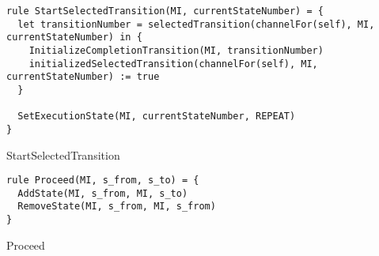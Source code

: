 \begin{listing}[H]
\begin{verbatim}
rule StartSelectedTransition(MI, currentStateNumber) = {
  let transitionNumber = selectedTransition(channelFor(self), MI, currentStateNumber) in {
    InitializeCompletionTransition(MI, transitionNumber)
    initializedSelectedTransition(channelFor(self), MI, currentStateNumber) := true
  }

  SetExecutionState(MI, currentStateNumber, REPEAT)
}
\end{verbatim}
\caption{StartSelectedTransition}
\label{lst:asm:StartSelectedTransition}
\end{listing}






\begin{listing}[H]
\begin{verbatim}
rule Proceed(MI, s_from, s_to) = {
  AddState(MI, s_from, MI, s_to)
  RemoveState(MI, s_from, MI, s_from)
}
\end{verbatim}
\caption{Proceed}
\label{lst:asm:Proceed}
\end{listing}




